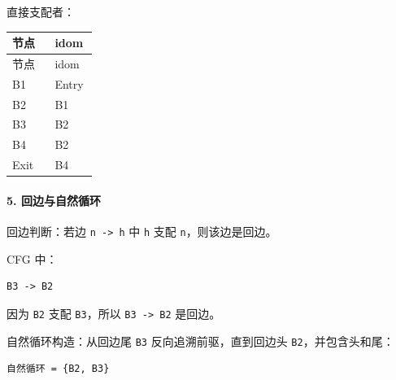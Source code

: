 \documentclass[UTF8]{ctexart}
\begin{document}
直接支配者：

\begin{longtable}{|p{0.47\linewidth}|p{0.47\linewidth}|}
\hline
节点 & idom \\
\hline
\endfirsthead
节点 & idom \\
\hline
\endhead
B1 & Entry \\
\hline
B2 & B1 \\
\hline
B3 & B2 \\
\hline
B4 & B2 \\
\hline
Exit & B4 \\
\hline
\end{longtable}

\paragraph*{5. 回边与自然循环}

回边判断：若边 \texttt{n -> h} 中 \texttt{h} 支配 \texttt{n}，则该边是回边。

CFG 中：

\begin{Verbatim}[fontsize=\small,breaklines=true]
B3 -> B2
\end{Verbatim}

因为 \texttt{B2} 支配 \texttt{B3}，所以 \texttt{B3 -> B2} 是回边。

自然循环构造：从回边尾 \texttt{B3} 反向追溯前驱，直到回边头 \texttt{B2}，并包含头和尾：

\begin{Verbatim}[fontsize=\small,breaklines=true]
自然循环 = {B2, B3}
\end{Verbatim}
\end{document}

